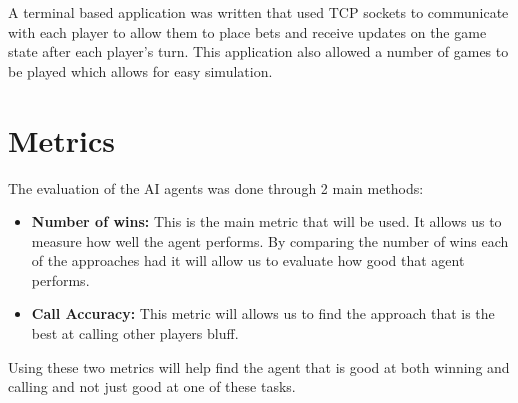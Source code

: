 A terminal based application was written that used TCP sockets to communicate with each player to allow them to place bets and receive updates on the game state after each player's turn. This application also allowed a number of games to be played which allows for easy simulation.

\section{Metrics}

The evaluation of the AI agents was done through 2 main methods:

\begin{itemize}
    \item \textbf{Number of wins:} This is the main metric that will be used. It allows us to measure how well the agent performs. By comparing the number of wins each of the approaches had it will allow us to evaluate how good that agent performs.
    \item \textbf{Call Accuracy:} This metric will allows us to find the approach that is the best at calling other players bluff.
\end{itemize}

Using these two metrics will help find the agent that is good at both winning and calling and not just good at one of these tasks.

